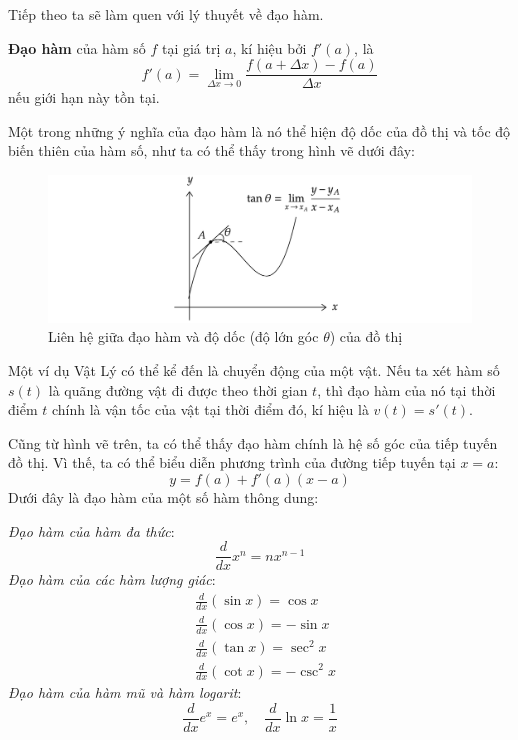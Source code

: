 Tiếp theo ta sẽ làm quen với lý thuyết về đạo hàm.
\begin{definition}
\textbf{Đạo hàm} của hàm số $f$ tại giá trị $a$, kí hiệu bởi $f'(a)$, là
    \begin{equation}
        f'(a)=\lim_{\Delta x\rightarrow 0}\frac{f(a+\Delta x)-f(a)}{\Delta x}
    \end{equation}
nếu giới hạn này tồn tại.
\end{definition}

Một trong những ý nghĩa của đạo hàm là nó thể hiện độ dốc của đồ thị và tốc độ biến thiên của hàm số, như ta có thể thấy trong hình vẽ dưới đây:

\begin{figure}[H]
\centering
\includegraphics[width=1\textwidth]{Tuan1/Figures/tocdobienthien.png}
\caption{Liên hệ giữa đạo hàm và độ dốc (độ lớn góc $\theta$) của đồ thị}
\end{figure}
Một ví dụ Vật Lý có thể kể đến là chuyển động của một vật. Nếu ta xét hàm số $s(t)$ là quãng đường vật đi được theo thời gian $t$, thì đạo hàm của nó tại thời điểm $t$ chính là vận tốc của vật tại thời điểm đó, kí hiệu là $v(t)=s'(t)$.

Cũng từ hình vẽ trên, ta có thể thấy đạo hàm chính là hệ số góc của tiếp tuyến đồ thị. Vì thế, ta có thể biểu diễn phương trình của đường tiếp tuyến tại $x=a$:
\begin{equation}
    y=f(a)+f'(a)(x-a)
\end{equation}
Dưới đây là đạo hàm của một số hàm thông dung:

\textit{Đạo hàm của hàm đa thức}:
\begin{equation}
    \frac{d}{dx}x^n=nx^{n-1}
\end{equation}
\textit{Đạo hàm của các hàm lượng giác}:
\begin{equation}
    \begin{aligned}
        &\frac{d}{dx}(\sin x)=\cos x\\
        &\frac{d}{dx}(\cos x)=-\sin x\\
        &\frac{d}{dx}(\tan x)=\sec^2 x\\
        &\frac{d}{dx}(\cot x)=-\csc^2 x
    \end{aligned}
\end{equation}
\textit{Đạo hàm của hàm mũ và hàm logarit}:
\begin{equation}
    \frac{d}{dx}e^x=e^x,\quad \frac{d}{dx}\ln x=\frac{1}{x}
\end{equation}

